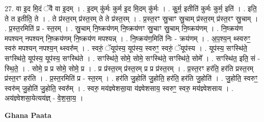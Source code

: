 \documentclass[17pt]{extarticle}
\begin{document}
27. वा इ॒द मि॒दं ॅवै वा इ॒दम् । . इ॒दम् कु॑र्मः कुर्म इ॒द मि॒दम् कु॑र्मः । . कु॒र्म॒ इतीति॑ कुर्मः कुर्म॒ इति॑ । . इति॒ ते त इतीति॒ ते । . ते प्र॑स्त॒रम् प्र॑स्त॒रम् ते ते प्र॑स्त॒रम् । . प्र॒स्त॒रꣳ स्रु॒चाꣳ स्रु॒चाम् प्र॑स्त॒रम् प्र॑स्त॒रꣳ स्रु॒चाम् । . प्र॒स्त॒रमिति॑ प्र - स्त॒रम् । . स्रु॒चाम् नि॒ष्क्रय॑णम् नि॒ष्क्रय॑णꣳ स्रु॒चाꣳ स्रु॒चाम् नि॒ष्क्रय॑णम् । . नि॒ष्क्रय॑ण मपश्यन् नपश्यन् नि॒ष्क्रय॑णम् नि॒ष्क्रय॑ण मपश्यन्न् । . नि॒ष्क्रय॑ण॒मिति॑ निः - क्रय॑णम् । . अ॒प॒श्य॒न् थ्स्वरुꣳ॒॒ स्वरु॑ मपश्यन् नपश्य॒न् थ्स्वरु᳚म् । . स्वरुं॒ ॅयूप॑स्य॒ यूप॑स्य॒ स्वरुꣳ॒॒ स्वरुं॒ ॅयूप॑स्य । . यूप॑स्य॒ सꣳस्थि॑ते॒ सꣳस्थि॑ते॒ यूप॑स्य॒ यूप॑स्य॒ सꣳस्थि॑ते । . सꣳस्थि॑ते॒ सोमे॒ सोमे॒ सꣳस्थि॑ते॒ सꣳस्थि॑ते॒ सोमे᳚ । . सꣳस्थि॑त॒ इति॒ सं - स्थि॒ते॒ । . सोमे॒ प्र प्र सोमे॒ सोमे॒ प्र । . प्र प्र॑स्त॒रम् प्र॑स्त॒रम् प्र प्र प्र॑स्त॒रम् । . प्र॒स्त॒रꣳ हर॑ति॒ हर॑ति प्रस्त॒रम् प्र॑स्त॒रꣳ हर॑ति । . प्र॒स्त॒रमिति॑ प्र - स्त॒रम् । . हर॑ति जु॒होति॑ जु॒होति॒ हर॑ति॒ हर॑ति जु॒होति॑ । . जु॒होति॒ स्वरुꣳ॒॒ स्वरु॑म् जु॒होति॑ जु॒होति॒ स्वरु᳚म् । . स्वरु॒ मय॑ज्ञ्वेशसा॒या य॑ज्ञ्वेशसाय॒ स्वरुꣳ॒॒ स्वरु॒ मय॑ज्ञ्वेशसाय । . अय॑ज्ञ्वेशसा॒येत्यय॑ज्ञ् - वे॒श॒सा॒य॒ । \newline

\textbf{Ghana Paata } \newline
\end{document}
